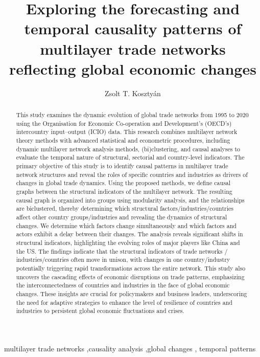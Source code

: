 \documentclass[preprint, 3p,
authoryear]{elsarticle} %
\begin{document}
\begin{frontmatter}

  \title{Exploring the forecasting and temporal causality patterns of
multilayer trade networks reflecting global economic changes}
    \author[Department of Quantitative Methods, University of
Pannonia]{Zsolt T. Kosztyán%
  }
  
  \begin{abstract}
  This study examines the dynamic evolution of global trade networks
  from 1995 to 2020 using the Organisation for Economic Co-operation and
  Development's (OECD's) intercountry input--output (ICIO) data. This
  research combines multilayer network theory methods with advanced
  statistical and econometric procedures, including dynamic multilayer
  network analysis methods, (bi)clustering, and causal analyses to
  evaluate the temporal nature of structural, sectorial and
  country-level indicators. The primary objective of this study is to
  identify causal patterns in multilayer trade network structures and
  reveal the roles of specific countries and industries as drivers of
  changes in global trade dynamics. Using the proposed methods, we
  define causal graphs between the structural indicators of the
  multilayer network. The resulting causal graph is organized into
  groups using modularity analysis, and the relationships are
  biclustered, thereby determining which structural
  factors/industries/countries affect other country groups/industries
  and revealing the dynamics of structural changes. We determine which
  factors change simultaneously and which factors and actors exhibit a
  delay between their changes. The analysis reveals significant shifts
  in structural indicators, highlighting the evolving roles of major
  players like China and the US. The findings indicate that the
  structural indicators of trade networks / industries/countries often
  move in unison, with changes in one country/industry potentially
  triggering rapid transformations across the entire network. This study
  also uncovers the cascading effects of economic disruptions on trade
  patterns, emphasizing the interconnectedness of countries and
  industries in the face of global economic changes. These insights are
  crucial for policymakers and business leaders, underscoring the need
  for adaptive strategies to enhance the level of resilience of
  countries and industries to persistent global economic fluctuations
  and crises.
  \end{abstract}
    \begin{keyword}
    multilayer trade networks \sep causality analysis \sep global
changes \sep 
    temporal patterns
  \end{keyword}
  
 \end{frontmatter}
\end{document}
